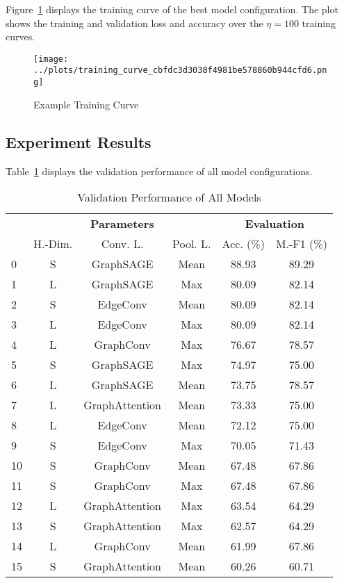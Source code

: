 \documentclass[10pt,conference,compsocconf]{IEEEtran}
\begin{document}
Figure~\ref{fig:training_curve} displays the training curve of the best model
configuration. The plot shows the training and validation loss and accuracy over
the $\eta = 100$ training curves.

\begin{figure}[!ht]
  \centering
  \texttt{[image: ../plots/training\_curve\_cbfdc3d3038f4981be578860b944cfd6.png]}
  \caption{Example Training Curve}
  \label{fig:training_curve}
\end{figure}

\subsection{Experiment Results}

Table~\ref{tab:results_all} displays the validation performance of all model
configurations.

\begin{table}[h]
  \centering
  \begin{tabular}{lccccc}
    \toprule
    & 
    \multicolumn{3}{c}{\textbf{Parameters}} &
    \multicolumn{2}{c}{\textbf{Evaluation}} \\
    & H.-Dim. & Conv. L. & Pool. L. & Acc. (\%) & M.-F1 (\%) \\
    \midrule
    0 & S & GraphSAGE & Mean & 88.93 & 89.29 \\
    1 & L & GraphSAGE & Max & 80.09 & 82.14 \\
    2 & S & EdgeConv & Mean & 80.09 & 82.14 \\
    3 & L & EdgeConv & Max & 80.09 & 82.14 \\
    4 & L & GraphConv & Max & 76.67 & 78.57 \\
    5 & S & GraphSAGE & Max & 74.97 & 75.00 \\
    6 & L & GraphSAGE & Mean & 73.75 & 78.57 \\
    7 & L & GraphAttention & Mean & 73.33 & 75.00 \\
    8 & L & EdgeConv & Mean & 72.12 & 75.00 \\
    9 & S & EdgeConv & Max & 70.05 & 71.43 \\
    10 & S & GraphConv & Mean & 67.48 & 67.86 \\
    11 & S & GraphConv & Max & 67.48 & 67.86 \\
    12 & L & GraphAttention & Max & 63.54 & 64.29 \\
    13 & S & GraphAttention & Max & 62.57 & 64.29 \\
    14 & L & GraphConv & Mean & 61.99 & 67.86 \\
    15 & S & GraphAttention & Mean & 60.26 & 60.71 \\
      \bottomrule
  \end{tabular}
  \caption{Validation Performance of All Models}
  \label{tab:results_all}
\end{table}
\end{document}
